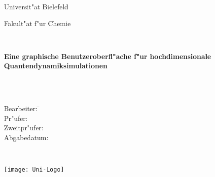 
\thispagestyle{empty}
\cleardoublepage

\thispagestyle{empty}
\begin{center}

    {\Large Universit"at Bielefeld}\\


    \vspace{.5cm}

    {\huge Fakult"at f"ur Chemie\\[1mm]}


    \vspace{1cm}

    {\Large \textbf{\workTyp}}\\
    \vspace{1.5cm}

    {\huge \textbf{{Eine graphische Benutzeroberfl"ache f"ur hochdimensionale Quantendynamiksimulationen}}}


    \vspace*{3mm}
    {\huge \textbf{ }}\\
    \vspace*{3mm}
    {\huge \textbf{}}\\\vspace*{2cm}

    \parbox{1cm}{
      \begin{large}
        \begin{tabbing}
          Bearbeiter: \hspace{1.5cm}
            \=\workNameStudent\\[2mm]
    Pr"ufer: \>\workPruefer\\[2mm]
    Zweitpr"ufer: \>\workZweitPruefer\\[5mm]
    Abgabedatum: \> \workDatum \\
        \end{tabbing}
      \end{large}
    }\\

    \vspace{.3cm}

    \texttt{[image: Uni-Logo]}

\end{center}
